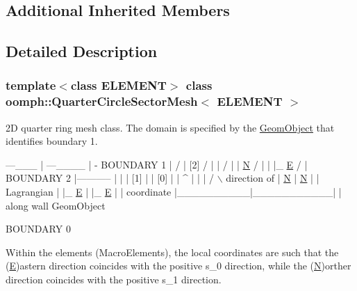 \subsection*{Additional Inherited Members}


\subsection{Detailed Description}
\subsubsection*{template$<$class E\+L\+E\+M\+E\+NT$>$\newline
class oomph\+::\+Quarter\+Circle\+Sector\+Mesh$<$ E\+L\+E\+M\+E\+N\+T $>$}

2D quarter ring mesh class. The domain is specified by the \hyperlink{classoomph_1_1GeomObject}{Geom\+Object} that identifies boundary 1.


\begin{DoxyCode}
                     ---\_\_\_
                    |      ---\_\_\_\_
                    |              -   BOUNDARY 1
                    |               /  
                    |     [2]      /  |  
                    |             /     | 
                    | \hyperlink{namespaceoomph_1_1QuadTreeNames_a8954a5947b19986b8c4b755bc7639f7dabc60bec4cc294aa2adf92726c6d6823a}{N}          /        |  
                    | |\_ \hyperlink{namespaceoomph_1_1QuadTreeNames_a8954a5947b19986b8c4b755bc7639f7da585070bd0e3801c3bbed287ef3c4a265}{E}      /          |    
     BOUNDARY 2     |-----------           |  
                    |          |    [1]    |
                    |   [0]    |           |  ^
                    |          |           | / \(\backslash\)  direction of
                    | \hyperlink{namespaceoomph_1_1QuadTreeNames_a8954a5947b19986b8c4b755bc7639f7dabc60bec4cc294aa2adf92726c6d6823a}{N}        |    \hyperlink{namespaceoomph_1_1QuadTreeNames_a8954a5947b19986b8c4b755bc7639f7dabc60bec4cc294aa2adf92726c6d6823a}{N}      |  |   Lagrangian 
                    | |\_ \hyperlink{namespaceoomph_1_1QuadTreeNames_a8954a5947b19986b8c4b755bc7639f7da585070bd0e3801c3bbed287ef3c4a265}{E}     |    |\_ \hyperlink{namespaceoomph_1_1QuadTreeNames_a8954a5947b19986b8c4b755bc7639f7da585070bd0e3801c3bbed287ef3c4a265}{E}   |  |   coordinate 
                    |\_\_\_\_\_\_\_\_\_\_|\_\_\_\_\_\_\_\_\_\_\_|  |   along wall GeomObject

                         BOUNDARY 0

Within the elements (MacroElements), the local coordinates
are such that the (\hyperlink{namespaceoomph_1_1QuadTreeNames_a8954a5947b19986b8c4b755bc7639f7da585070bd0e3801c3bbed287ef3c4a265}{E})astern direction coincides with the positive 
s\_0 direction,  \textcolor{keywordflow}{while} the (\hyperlink{namespaceoomph_1_1QuadTreeNames_a8954a5947b19986b8c4b755bc7639f7dabc60bec4cc294aa2adf92726c6d6823a}{N})orther direction coincides with the positive 
s\_1 direction.
\end{DoxyCode}


